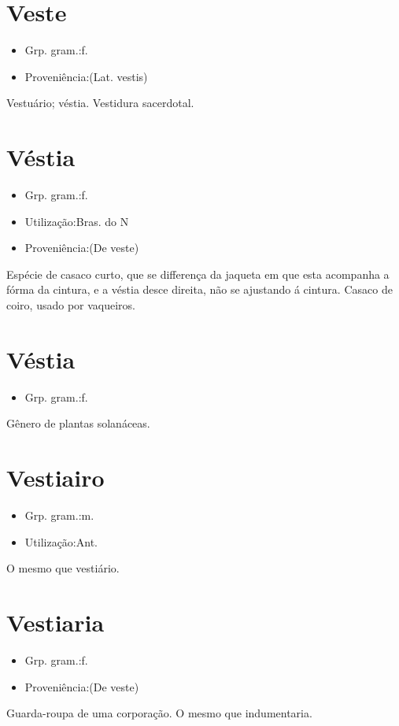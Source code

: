 \documentclass{article}
\begin{document}
\section{Veste}
\begin{itemize}
\item {Grp. gram.:f.}
\end{itemize}
\begin{itemize}
\item {Proveniência:(Lat. \textunderscore vestis\textunderscore )}
\end{itemize}
Vestuário; véstia.
Vestidura sacerdotal.
\section{Véstia}
\begin{itemize}
\item {Grp. gram.:f.}
\end{itemize}
\begin{itemize}
\item {Utilização:Bras. do N}
\end{itemize}
\begin{itemize}
\item {Proveniência:(De \textunderscore veste\textunderscore )}
\end{itemize}
Espécie de casaco curto, que se differença da jaqueta em que esta acompanha a fórma da cintura, e a véstia desce direita, não se ajustando á cintura.
Casaco de coiro, usado por vaqueiros.
\section{Véstia}
\begin{itemize}
\item {Grp. gram.:f.}
\end{itemize}
Gênero de plantas solanáceas.
\section{Vestiairo}
\begin{itemize}
\item {Grp. gram.:m.}
\end{itemize}
\begin{itemize}
\item {Utilização:Ant.}
\end{itemize}
O mesmo que \textunderscore vestiário\textunderscore .
\section{Vestiaria}
\begin{itemize}
\item {Grp. gram.:f.}
\end{itemize}
\begin{itemize}
\item {Proveniência:(De \textunderscore veste\textunderscore )}
\end{itemize}
Guarda-roupa de uma corporação.
O mesmo que \textunderscore indumentaria\textunderscore .
\end{document}
